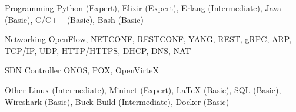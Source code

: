 

\begin{cvskills}

  \cvskill
    {Programming} %
    {Python (Expert), Elixir (Expert), Erlang (Intermediate), Java (Basic), C/C++ (Basic),
      Bash (Basic)} %

  \cvskill
    {Networking} %
    {OpenFlow, NETCONF, RESTCONF, YANG, REST, gRPC, ARP, TCP/IP, UDP, HTTP/HTTPS,
      DHCP, DNS, NAT} %

  \cvskill
    {SDN Controller} %
    {ONOS, POX, OpenVirteX} %

  \cvskill
    {Other} %
    {Linux (Intermediate), Mininet (Expert), LaTeX (Basic), SQL (Basic), Wireshark (Basic),
     Buck-Build (Intermediate), Docker (Basic)} %
\end{cvskills}